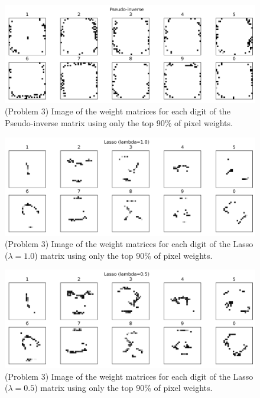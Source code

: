 \documentclass[10pt]{article}
\begin{document}
\begin{figure}[ht]
\centerline{\includegraphics[scale=0.75]{figures/weight_matrix_pinv_geq_90th_no_zeros.png}}
\caption{(Problem 3) Image of the weight matrices for each digit of the Pseudo-inverse matrix using only the top 90\% of pixel weights.}
\label{fig15}
\end{figure}

\begin{figure}[ht]
\centerline{\includegraphics[scale=0.75]{figures/weight_matrix_lasso_1_geq_90th_no_zeros.png}}
\caption{(Problem 3) Image of the weight matrices for each digit of the Lasso ($\lambda=1.0$)  matrix using only the top 90\% of pixel weights.}
\label{fig16}
\end{figure}

\begin{figure}[ht]
\centerline{\includegraphics[scale=0.75]{figures/weight_matrix_lasso_05_geq_90th_no_zeros.png}}
\caption{(Problem 3) Image of the weight matrices for each digit of the Lasso ($\lambda=0.5$)  matrix using only the top 90\% of pixel weights.}
\label{fig17}
\end{figure}
\end{document}
